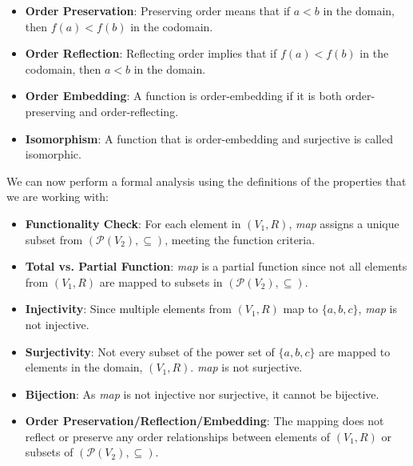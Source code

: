 \documentclass[12pt]{article}
\begin{document}
\begin{spacing}{1.5}
\begin{itemize}
		\item \textbf{Order Preservation}: Preserving order means that if $a < b$ in the domain, then $f(a) < f(b)$ in the codomain.
		      		          
		\item \textbf{Order Reflection}: Reflecting order implies that if $f(a) < f(b)$ in the codomain, then $a < b$ in the domain.
		      		          
		\item \textbf{Order Embedding}: A function is order-embedding if it is both order-preserving and order-reflecting.
		      		          
		\item \textbf{Isomorphism}: A function that is order-embedding and surjective is called isomorphic. 
	\end{itemize}
		
	\noindent We can now perform a formal analysis using the definitions of the properties that we are working with:
		
	\begin{itemize}
		\item \textbf{Functionality Check}: For each element in $(V_1, R)$, \textit{map} assigns a unique subset from $(\mathcal{P}(V_2), \subseteq)$, meeting the function criteria.
		      		      
		\item \textbf{Total vs. Partial Function}: \textit{map} is a partial function since not all elements from $(V_1, R)$ are mapped to subsets in $(\mathcal{P}(V_2), \subseteq)$.
		      		      
		\item \textbf{Injectivity}: Since multiple elements from $(V_1, R)$ map to $\{a,b,c\}$, \textit{map} is not injective.
		      		      
		\item \textbf{Surjectivity}: Not every subset of the power set of $\{a,b,c\}$ are mapped to elements in the domain, $(V_1,R)$. \textit{map} is not surjective.
		      		      
		\item \textbf{Bijection}: As \textit{map} is not injective nor surjective, it cannot be bijective.
		      		      
		\item \textbf{Order Preservation/Reflection/Embedding}: The mapping does not reflect or preserve any order relationships between elements of $(V_1, R)$ or subsets of $(\mathcal{P}(V_2), \subseteq)$.
		      		      

\end{itemize}
\end{spacing}
\end{document}
